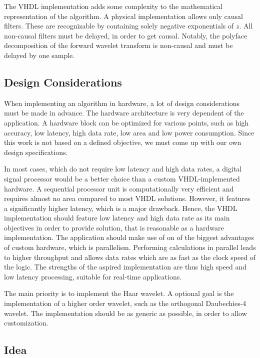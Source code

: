 \begin{refsection}
The VHDL implementation adds some complexity to the mathematical representation of the algorithm.
A physical implementation allows only causal filters.
These are recognizable by containing solely negative exponentials of $z$.
All non-causal filters must be delayed, in order to get causal.
Notably, the polyface decomposition of the forward wavelet transform is non-causal and must be delayed by one sample.

\subsection{Design Considerations}

When implementing an algorithm in hardware, a lot of design considerations must be made in advance.
The hardware architecture is very dependent of the application.
A hardware block can be optimized for various points, such as high accuracy, low latency, high data rate, low area and low power consumption.
Since this work is not based on a defined objective, we must come up with our own design specifications.

In most cases, which do not require low latency and high data rates, a digital signal processor would be a better choice than a custom VHDL-implemented hardware.
A sequential processor unit is computationally very efficient and requires almost no area compared to most VHDL solutions.
However, it features a significantly higher latency, which is a major drawback.
Hence, the VHDL implementation should feature low latency and high data rate as its main objectives in order to provide solution, that is reasonable as a hardware implementation.
The application should make use of on of the biggest advantages of custom hardware, which is parallelism.
Performing calculations in parallel leads to higher throughput and allows data rates which are as fast as the clock speed of the logic.
The strengths of the aspired implementation are thus high speed and low latency processing, suitable for real-time applications.

The main priority is to implement the Haar wavelet.
A optional goal is the implementation of a higher order wavelet, such as the orthogonal Daubechies-4 wavelet.
The implementation should be as generic as possible, in order to allow customization.

\subsection{Idea}


\end{refsection}
